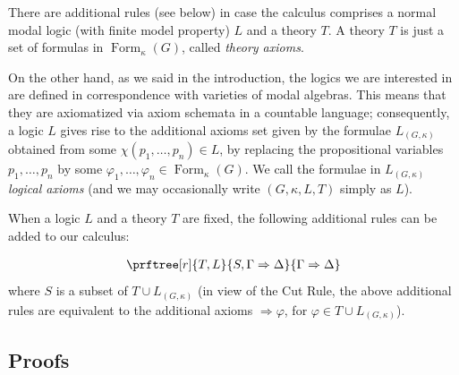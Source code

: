 \documentclass{article}
\theoremstyle{definition}
\newtheorem{defn}{Definition}
\DeclareMathOperator{\Formulas}{Form}
\begin{document}
There are additional rules 
(see below)
in case the calculus comprises a normal modal logic (with finite model property) $L$ and a theory $T$. A theory $T$ is just a set of formulas in $\Formulas_\kappa(G)$, called \emph{theory axioms}. 


On the other hand, as we said in the introduction, the logics we are interested in are defined in correspondence with varieties of modal algebras. This means that they are axiomatized via axiom schemata in a countable language; consequently, a logic $L$ gives rise to the additional axioms set given by the formulae $L_{(G,\kappa)}$ obtained from some $\chi(p_1, \dots, p_n) \in L$, by replacing the propositional variables $p_1,\dots,p_n$ by some $\varphi_1,\dots,\varphi_n \in \Formulas_\kappa(G)$. We call the formulae in $L_{(G,\kappa)}$ \emph{logical axioms} (and we may  occasionally write $(G,\kappa,L,T)$ simply as $L$).
 


When a logic $L$ and a theory $T$ are fixed, the following additional rules can be added to our calculus:






\begin{align*}
\prftree[r]{\scriptsize T,L} 
{S, \Gamma \Rightarrow \Delta}
{\Gamma \Rightarrow \Delta}
\end{align*}
where $S$ is a subset of $T\cup L_{(G,\kappa)}$ 
(in view of the Cut Rule, the above additional rules are equivalent to the additional axioms
$\Rightarrow \varphi$, for $\varphi \in T\cup L_{(G,\kappa)}$).



\subsection{Proofs}
\end{document}
